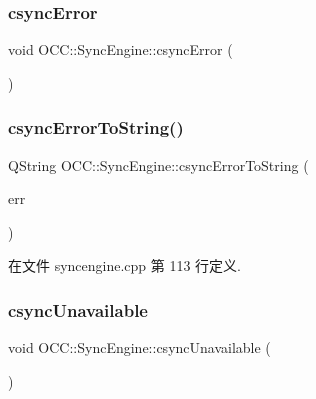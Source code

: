 \subsubsection{\texorpdfstring{csync\+Error}{csyncError}}
{\footnotesize\ttfamily void O\+C\+C\+::\+Sync\+Engine\+::csync\+Error (\begin{DoxyParamCaption}\item[{const Q\+String \&}]{ }\end{DoxyParamCaption})\hspace{0.3cm}{\ttfamily [signal]}}

\mbox{\label{class_o_c_c_1_1_sync_engine_a4924be69b9fb674d6f885a842d47d750}} 
\subsubsection{\texorpdfstring{csync\+Error\+To\+String()}{csyncErrorToString()}}
{\footnotesize\ttfamily Q\+String O\+C\+C\+::\+Sync\+Engine\+::csync\+Error\+To\+String (\begin{DoxyParamCaption}\item[{C\+S\+Y\+N\+C\+\_\+\+S\+T\+A\+T\+US}]{err }\end{DoxyParamCaption})\hspace{0.3cm}{\ttfamily [static]}}



在文件 syncengine.\+cpp 第 113 行定义.

\mbox{\label{class_o_c_c_1_1_sync_engine_a61cf256fb8386ee796651636d8802863}} 
\subsubsection{\texorpdfstring{csync\+Unavailable}{csyncUnavailable}}
{\footnotesize\ttfamily void O\+C\+C\+::\+Sync\+Engine\+::csync\+Unavailable (\begin{DoxyParamCaption}{ }\end{DoxyParamCaption})\hspace{0.3cm}{\ttfamily [signal]}}

